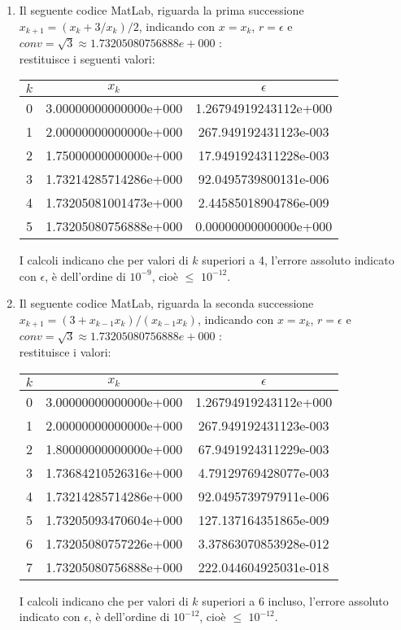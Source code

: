 \begin{enumerate}
\item
Il seguente codice MatLab, riguarda la prima successione $x_{k+1} = (x_k + 3/x_k)/2$, indicando con $x=x_k$, $r=\epsilon$ e $conv = \sqrt{3} \approx 1.73205080756888e+000$ :\\

restituisce i seguenti valori:\\
\begin{center}
\begin{tabular}{|c|c|c|}
\hline
$k$ & $x_k$ & $\epsilon$ \\
\hline
    0 & 3.00000000000000e+000 & 1.26794919243112e+000\\
    1 & 2.00000000000000e+000 & 267.949192431123e-003\\
    2 & 1.75000000000000e+000 & 17.9491924311228e-003\\
    3 & 1.73214285714286e+000 & 92.0495739800131e-006\\
    4 & 1.73205081001473e+000 & 2.44585018904786e-009\\
    5 & 1.73205080756888e+000 & 0.00000000000000e+000\\
\hline
\end{tabular}
\end{center}
I calcoli indicano che per valori di $k$ superiori a 4, l'errore assoluto indicato con $\epsilon$, è dell'ordine di \(10^{-9}\), cioè $\leq$ \(10^{-12}\).\\
\item
Il seguente codice MatLab, riguarda la seconda successione $x_{k+1} = (3+x_{k-1}x_k)/(x_{k-1}x_k)$, indicando con $x=x_k$, $r=\epsilon$ e $conv = \sqrt{3} \approx 1.73205080756888e+000$ :\\

restituisce i valori:\\
\begin{center}
\begin{tabular}{|c|c|c|}
\hline
$k$ & $x_k$ & $\epsilon$ \\
\hline
    0 & 3.00000000000000e+000 & 1.26794919243112e+000\\
    1 & 2.00000000000000e+000 & 267.949192431123e-003\\
    2 & 1.80000000000000e+000 & 67.9491924311229e-003\\
    3 & 1.73684210526316e+000 & 4.79129769428077e-003\\
    4 & 1.73214285714286e+000 & 92.0495739797911e-006\\
    5 & 1.73205093470604e+000 & 127.137164351865e-009\\
    6 & 1.73205080757226e+000 & 3.37863070853928e-012\\
    7 & 1.73205080756888e+000 & 222.044604925031e-018\\
\hline
\end{tabular}
\end{center}
I calcoli indicano che per valori di $k$ superiori a 6 incluso, l'errore assoluto indicato con $\epsilon$, è dell'ordine di \(10^{-12}\), cioè $\leq$ \(10^{-12}\).\\
\end{enumerate}